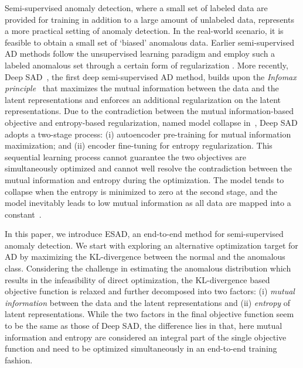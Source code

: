 \documentclass{bmvc2k}
\begin{document}
Semi-supervised anomaly detection, where a small set of labeled data are provided for training in addition to a large amount of unlabeled data, represents a more practical setting of anomaly detection. In the real-world scenario, it is feasible to obtain a small set of `biased' anomalous data. Earlier semi-supervised AD methods follow the unsupervised learning paradigm and employ such a labeled anomalous set through a certain form of regularization \cite{munoz2010semisupervised,gornitz2013toward}. More recently, Deep SAD~\cite{SAD}, the first deep semi-supervised AD method, builds upon the \emph{Infomax principle}~\cite{linsker1988self,bell1995information,hjelm2019learning} that maximizes the mutual information between the data and the latent representations and enforces an additional regularization on the latent representations. Due to the contradiction between the mutual information-based objective and entropy-based regularization, named model collapse in~\cite{ruff2018deep,SAD}, Deep SAD adopts a two-stage process: (i) autoencoder pre-training for mutual information maximization; and (ii) encoder fine-tuning for entropy regularization. This sequential learning process cannot guarantee the two objectives are simultaneously optimized and cannot well resolve the contradiction between the mutual information and entropy during the optimization. The model tends to collapse when the entropy is minimized to zero at the second stage, and the model inevitably leads to low mutual information as all data are mapped into a constant~\cite{ruff2018deep,SAD}.

In this paper, we introduce ESAD, an end-to-end method for semi-supervised anomaly detection. We start with exploring an alternative optimization target for AD by maximizing the KL-divergence between the normal and the anomalous class. Considering the challenge in estimating the anomalous distribution which results in the infeasibility of direct optimization, the KL-divergence based objective function is relaxed and further decomposed into two factors: (i) \emph{mutual information} between the data and the latent representations and (ii) \emph{entropy} of latent representations. While the two factors in the final objective function seem to be the same as those of Deep SAD, the difference lies in that, here mutual information and entropy are considered an integral part of the single objective function and need to be optimized simultaneously in an end-to-end training fashion.
\end{document}

